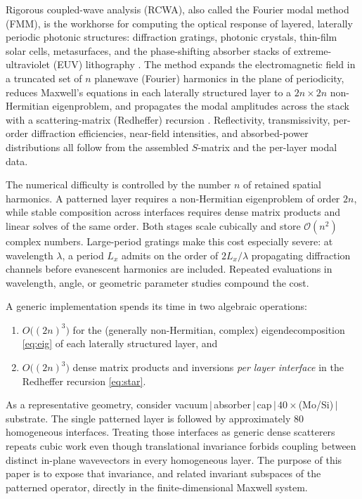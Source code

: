 \documentclass[11pt]{article}
\theoremstyle{remark}
\newcommand{\order}{\mathcal{O}}
\begin{document}
Rigorous coupled-wave analysis (RCWA), also called the Fourier modal method
(FMM), is the workhorse for computing the optical response of layered,
laterally periodic photonic structures: diffraction gratings, photonic
crystals, thin-film solar cells, metasurfaces, and the phase-shifting absorber
stacks of extreme-ultraviolet (EUV) lithography
\cite{moharam1981rcwa,moharam1995formulation,liu2014s4}.
The method expands the electromagnetic field in a truncated set of $n$
planewave (Fourier) harmonics in the plane of periodicity, reduces Maxwell's
equations in each laterally structured layer to a $2n\times2n$ non-Hermitian
eigenproblem, and propagates the modal amplitudes across the stack with a
scattering-matrix (Redheffer) recursion \cite{whittaker1999scattering,li1996recursive}.
Reflectivity, transmissivity, per-order diffraction efficiencies, near-field
intensities, and absorbed-power distributions all follow from the assembled
$S$-matrix and the per-layer modal data.

The numerical difficulty is controlled by the number $n$ of retained spatial
harmonics.  A patterned layer requires a non-Hermitian eigenproblem of order
$2n$, while stable composition across interfaces requires dense matrix products
and linear solves of the same order.  Both stages scale cubically and store
$\order(n^2)$ complex numbers.  Large-period gratings make this cost especially
severe: at wavelength $\lambda$, a period $L_x$ admits on the order of
$2L_x/\lambda$ propagating diffraction channels before evanescent harmonics are
included.  Repeated evaluations in wavelength, angle, or geometric parameter
studies compound the cost.

A generic implementation spends its time in two algebraic operations:

\begin{enumerate}
\item $O\big((2n)^3\big)$ for the (generally non-Hermitian, complex)
  eigendecomposition \eqref{eq:eig} of each laterally structured layer, and
\item $O\big((2n)^3\big)$ dense matrix products and inversions \emph{per layer
  interface} in the Redheffer recursion \eqref{eq:star}.
\end{enumerate}

As a representative geometry, consider
vacuum$\,|\,$absorber$\,|\,$cap$\,|\,40\times$(Mo/Si)$\,|\,$substrate.  The
single patterned layer is followed by approximately 80 homogeneous interfaces.
Treating those interfaces as generic dense scatterers repeats cubic work even
though translational invariance forbids coupling between distinct in-plane
wavevectors in every homogeneous layer.  The purpose of this paper is to expose
that invariance, and related invariant subspaces of the patterned operator,
directly in the finite-dimensional Maxwell system.
\end{document}
